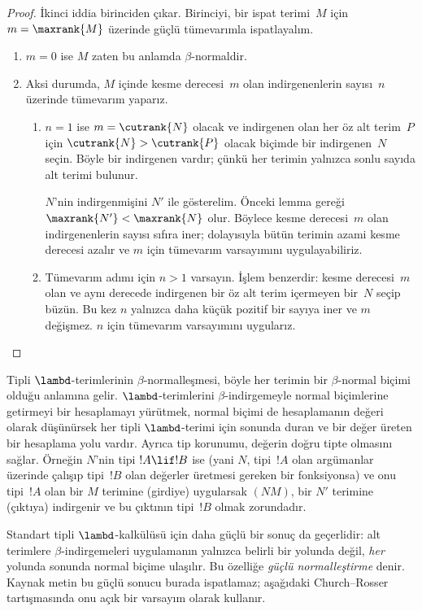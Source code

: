 \documentclass[../../../include/open-logic-section]{subfiles}
\begin{document}
\begin{proof}
  İkinci iddia birinciden çıkar. Birinciyi, bir ispat terimi~$M$ için
  $m=\maxrank{M}$ üzerinde güçlü tümevarımla ispatlayalım.
  \begin{enumerate}
  \item $m=0$ ise $M$ zaten bu anlamda $\beta$-normaldir.
  \item Aksi durumda, $M$ içinde kesme derecesi~$m$ olan indirgenenlerin
    sayısı~$n$ üzerinde tümevarım yaparız.
    \begin{enumerate}
    \item $n=1$ ise $m = \cutrank{N}$ olacak ve indirgenen olan her öz
      alt terim~$P$ için $\cutrank{N} > \cutrank{P}$ olacak biçimde bir
      indirgenen~$N$ seçin. Böyle bir indirgenen vardır; çünkü her terimin
      yalnızca sonlu sayıda alt terimi bulunur.

      $N$'nin indirgenmişini $N'$ ile gösterelim. Önceki lemma gereği
      $\maxrank{N'} < \maxrank{N}$ olur. Böylece kesme derecesi~$m$ olan
      indirgenenlerin sayısı sıfıra iner; dolayısıyla bütün terimin azami
      kesme derecesi azalır ve $m$ için tümevarım varsayımını uygulayabiliriz.
    \item Tümevarım adımı için $n>1$ varsayın. İşlem benzerdir: kesme
      derecesi~$m$ olan ve aynı derecede indirgenen bir öz alt terim
      içermeyen bir~$N$ seçip büzün. Bu kez $n$ yalnızca daha küçük pozitif
      bir sayıya iner ve $m$ değişmez. $n$ için tümevarım varsayımını
      uygularız.
    \end{enumerate}
  \end{enumerate}
\end{proof}

Tipli $\lambd$-terimlerinin $\beta$-normalleşmesi, böyle her terimin bir
$\beta$-normal biçimi olduğu anlamına gelir. $\lambd$-terimlerini $\beta$-indirgemeyle
normal biçimlerine getirmeyi bir hesaplamayı yürütmek, normal biçimi de
hesaplamanın değeri olarak düşünürsek her tipli $\lambd$-terimi için sonunda
duran ve bir değer üreten bir hesaplama yolu vardır. Ayrıca tip korunumu, değerin
doğru tipte olmasını sağlar. Örneğin $N$'nin tipi $!A \lif !B$ ise (yani
$N$, tipi~$!A$ olan argümanlar üzerinde çalışıp tipi~$!B$ olan değerler
üretmesi gereken bir fonksiyonsa) ve onu tipi~$!A$ olan bir $M$ terimine
(girdiye) uygularsak $(NM)$, bir $N'$ terimine (çıktıya) indirgenir ve bu
çıktının tipi~$!B$ olmak zorundadır.

Standart tipli $\lambd$-kalkülüsü için daha güçlü bir sonuç da geçerlidir:
alt terimlere $\beta$-indirgemeleri uygulamanın yalnızca belirli bir yolunda
değil, \emph{her} yolunda sonunda normal biçime ulaşılır. Bu özelliğe
\emph{güçlü normalleştirme} denir. Kaynak metin bu güçlü sonucu burada
ispatlamaz; aşağıdaki Church--Rosser tartışmasında onu açık bir varsayım olarak
kullanır.
\end{document}
